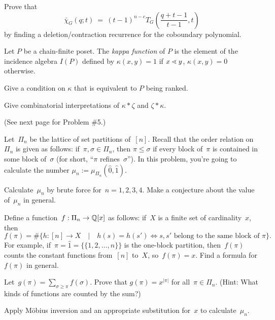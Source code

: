Prove that 
  $$\bar\chi_G(q;t) ~=~ (t-1)^{n-c} T_G\left(\frac{q+t-1}{t-1},t\right)$$
by finding a deletion/contraction recurrence for the coboundary polynomial.

\prob
Let $P$ be a chain-finite poset.
The \emph{kappa function} of $P$ is the element
of the incidence algebra $I(P)$ defined by $\kappa(x,y) = 1$
if $x\lessdot y$, $\kappa(x,y) = 0$ otherwise.

\probpart Give a condition on $\kappa$ that is equivalent   
to $P$ being ranked.

\probpart Give combinatorial interpretations of
$\kappa*\zeta$ and $\zeta*\kappa$.

(See next page for Problem \#5.)
\pagebreak

\prob
Let~$\Pi_n$ be the lattice of set partitions of~$[n]$.  Recall that the
order relation on~$\Pi_n$ is given as follows: if~$\pi,\sigma\in\Pi_n$,
then $\pi\leq\sigma$
if every block of~$\pi$ is contained in some block of~$\sigma$ (for short,
``$\pi$ refines~$\sigma$'').
In this problem,
you're going to calculate the number $\mu_n:=\mu_{\Pi_n}(\hat0,\hat1)$.

\probpart Calculate~$\mu_n$ by brute force for~$n=1,2,3,4$.
Make a conjecture about the value of~$\mu_n$ in general.    

\probpart Define a function~$f:\Pi_n\to\mathbb{Q}[x]$ as follows: if~$X$
is a finite set of cardinality~$x$, then
  $$f(\pi) = \#\big\{h:[n]\to X \quad\big\vert\quad h(s)=h(s') \iff s,s'
    \text{ belong to the same block of }\pi\big\}.$$
For example, if~$\pi=\hat 1=\{\{1,2,\dots,n\}\}$ is the one-block
partition, then~$f(\pi)$ counts the constant functions from~$[n]$ to~$X$,
so~$f(\pi)=x$.  Find a formula for $f(\pi)$ in general.

\probpart Let~$g(\pi)=\sum_{\sigma\geq\pi} f(\sigma)$.  Prove that
$g(\pi) = x^{|\pi|}$ for all~$\pi\in\Pi_n$.  (Hint: What kinds of
functions are counted by the sum?)

\probpart Apply M\"obius inversion and
an appropriate substitution for~$x$ to calculate~$\mu_n$.


